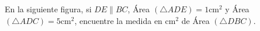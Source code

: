 En la siguiente figura, si $DE\parallel BC$, Área $(\triangle ADE) = 1 \text{cm}^2$ y Área $(\triangle ADC) = 5 \text{cm}^2$, encuentre la medida en cm$^2$ de Área $(\triangle DBC)$.